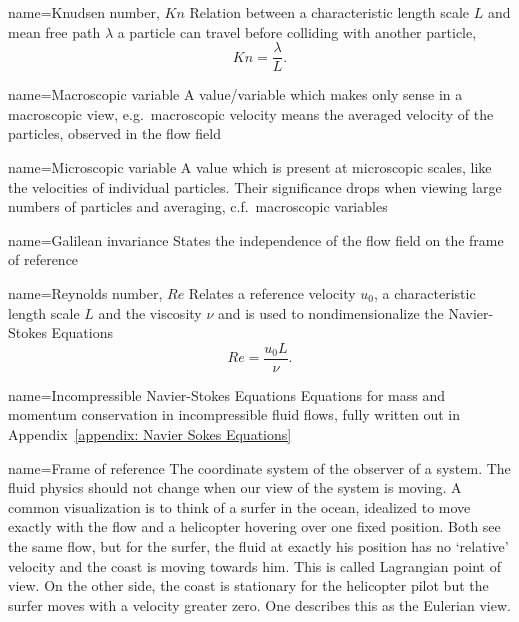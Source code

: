 
{
name={Knudsen number, $Kn$}
}
{Relation between a characteristic length scale $L$ and mean free path $\lambda$ a particle can travel before colliding with another particle,
\begin{equation}
  \label{eq: definition of knudsen number}
  Kn=\frac{\lambda}{L}.
\end{equation}}

{
name={Macroscopic variable}
}
{A value/variable which makes only sense in a macroscopic view, e.g.\ macroscopic velocity means the averaged velocity of the particles, observed in the flow field
}

{
name={Microscopic variable}
}
{
A value which is present at microscopic scales, like the velocities of individual particles. Their significance drops when viewing large numbers of particles and averaging, c.f.\ macroscopic variables
}

{
name={Galilean invariance}
}{States the independence of the flow field on the frame of reference}

{
name={Reynolds number, $Re$}
}
{Relates a reference velocity $u_0$, a characteristic length scale $L$ and the viscosity $\nu$ and is used to nondimensionalize the Navier-Stokes Equations
\begin{equation}
  \label{eq: definition of reynolds number}
  Re=\frac{u_0 L}{\nu}.
\end{equation}}

{
name={Incompressible Navier-Stokes Equations}
}
{Equations for mass and momentum conservation in incompressible fluid flows, fully written out in Appendix~\ref{appendix: Navier Sokes Equations}
}

{
name={Frame of reference}
}
{
The coordinate system of the observer of a system.
The fluid physics should not change when our view of the system is moving.
A common visualization is to think of a surfer in the ocean, idealized to move exactly with the flow and a helicopter hovering over one fixed position.
Both see the same flow, but for the surfer, the fluid at exactly his position has no `relative' velocity and the coast is moving towards him. This is called Lagrangian point of view.
On the other side, the coast is stationary for the helicopter pilot but the surfer moves with a velocity greater zero. One describes this as the Eulerian view.
}
